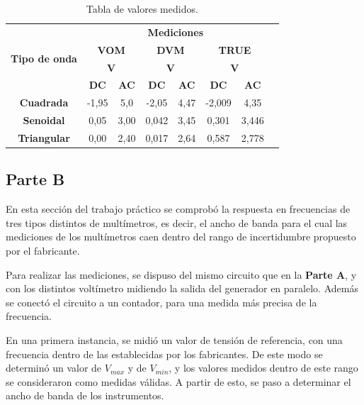 \documentclass{article}
\begin{document}
\begin{table}[!hbt]
	\begin{center}

		\begin{tabular}{|c|c|c|c|c|c|c|c|} \hline
			\multirow{4}{*}{\textbf{Tipo de onda}}

			& \multicolumn{6}{c|}{\textbf{Mediciones}} \\\cline{2-7}
			& \multicolumn{2}{c|}{\textbf{VOM}} & \multicolumn{2}{c|}{\textbf{DVM}} & \multicolumn{2}{c|}{\textbf{TRUE}} \\\cline{2-7}
			& \multicolumn{2}{c|}{\textbf{V}} & \multicolumn{2}{c|}{\textbf{V}} & \multicolumn{2}{c|}{\textbf{V}} \\\cline{2-7}
			& \textbf{DC} & \textbf{AC} & \textbf{DC} & \textbf{AC} & \textbf{DC} & \textbf{AC} \\\hline
			\textbf{Cuadrada} & -1,95 & 5,0 & -2,05 & 4,47 & -2,009 & 4,35 \\\hline
			\textbf{Senoidal} & 0,05 & 3,00 & 0,042 & 3,45 & 0,301 & 3,446 \\\hline
			\textbf{Triangular} & 0,00 & 2,40 & 0,017 & 2,64 & 0,587 & 2,778 \\\hline
		\end{tabular}

	\caption{Tabla de valores medidos.}
	\end{center}
\end{table}
\bigskip



\subsection{Parte B}

En esta sección del trabajo práctico se comprobó la respuesta en frecuencias de tres tipos distintos de multímetros, es decir, el ancho de banda para el cual las mediciones de los multímetros caen dentro del rango de incertidumbre propuesto por el fabricante.


Para realizar las mediciones, se dispuso del mismo circuito que en la \textbf{Parte A}, y con los distintos voltímetro midiendo la salida del generador en paralelo. Además se conectó el circuito a un contador, para una medida más precisa de la frecuencia.

En una primera instancia, se midió un valor de tensión de referencia, con una frecuencia dentro de las establecidas por los fabricantes. De este modo se determinó un valor de \textbf{$V_{max}$} y de \textbf{$V_{min}$}, y los valores medidos dentro de este rango se consideraron como medidas válidas. A partir de esto, se paso a determinar el ancho de banda de los instrumentos.
\bigskip
\end{document}

